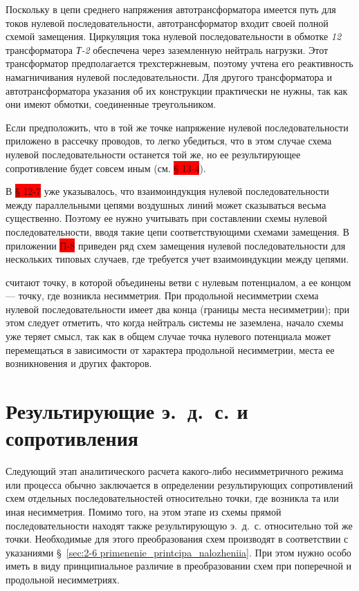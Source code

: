 Поскольку в цепи среднего напряжения автотрансформатора имеется путь для токов нулевой последовательности, автотрансформатор входит своей полной схемой замещения. Циркуляция тока нулевой последовательности в обмотке \textit{12} трансформатора \textit{Т-2} обеспечена через заземленную нейтраль нагрузки. Этот трансформатор предполагается трехстержневым, поэтому учтена его реактивность намагничивания нулевой последовательности. Для другого трансформатора и автотрансформатора указания об их конструкции практически не нужны, так как они имеют обмотки, соединенные треугольником.

Если предположить, что в той же точке напряжение нулевой последовательности приложено в рассечку проводов, то легко убедиться, что в этом случае схема нулевой последовательности останется той же, но ее результирующее сопротивление будет совсем иным (см. \colorbox{red}{§ 13-4}).

В \colorbox{red}{§ 12-7} уже указывалось, что взаимоиндукция нулевой последовательности между параллельными цепями воздушных линий может сказываться весьма существенно. Поэтому ее нужно учитывать при составлении схемы нулевой последовательности, вводя такие цепи соответствующими схемами замещения. В приложении \colorbox{red}{П-8} приведен ряд схем замещения нулевой последовательности для нескольких типовых случаев, где требуется учет взаимоиндукции между цепями.

 считают точку, в которой объединены ветви с нулевым потенциалом, а ее концом — точку, где возникла несимметрия. При продольной несимметрии схема нулевой последовательности имеет два конца (границы места несимметрии); при этом следует отметить, что когда нейтраль системы не заземлена, начало схемы уже теряет смысл, так как в общем случае точка нулевого потенциала может перемещаться в зависимости от характера продольной несимметрии, места ее возникновения и других факторов.

\section{Результирующие э.~д.~с. и сопротивления}
\label{sec:13-4 rezultiruiushchie_e.d.s._i_soprotivleniia}

Следующий этап аналитического расчета какого-либо несимметричного режима или процесса обычно заключается в определении результирующих сопротивлений схем отдельных последовательностей относительно точки, где возникла та или иная несимметрия. Помимо того, на этом этапе из схемы прямой последовательности находят также результирующую э.~д.~с. относительно той же точки. Необходимые для этого преобразования схем производят в соответствии с указаниями §~\ref{sec:2-6 primenenie_printcipa_nalozheniia}. При этом нужно особо иметь в виду принципиальное различие в преобразовании схем при поперечной и продольной несимметриях.

